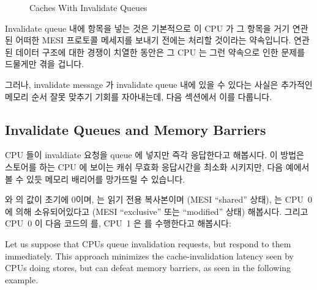 \fi

\begin{figure}[htb]
\centering
{}
\caption{Caches With Invalidate Queues}
\label{fig:app:whymb:Caches With Invalidate Queues}
\end{figure}

Invalidate queue 내에 항목을 넣는 것은 기본적으로 이 CPU 가 그 항목을 거기
연관된 어떠한 MESI 프로토콜 메세지를 보내기 전에는 처리할 것이라는 약속입니다.
연관된 데이터 구조에 대한 경쟁이 치열한 동안은 그 CPU 는 그런 약속으로 인한
문제를 드물게만 겪을 겁니다.

그러나, invalidate message 가 invalidate queue 내에 있을 수 있다는 사실은
추가적인 메모리 순서 잘못 맞추기 기회를 자아내는데, 다음 섹션에서 이를
다룹니다.

\iffalse

Placing an entry into the invalidate queue is essentially a promise
by the CPU to process that entry before transmitting any MESI protocol
messages regarding that cache line.
As long as the corresponding data structures are not highly contended,
the CPU will rarely be inconvenienced by such a promise.

However, the fact that invalidate messages can be buffered in the
invalidate queue provides additional opportunity for memory-misordering,
as discussed in the next section.

\fi

\subsection{Invalidate Queues and Memory Barriers}
\label{sec:app:whymb:Invalidate Queues and Memory Barriers}

CPU 들이 invaldiate 요청을 queue 에 넣지만 즉각 응답한다고 해봅시다.
이 방법은 스토어를 하는 CPU 에 보이는 캐쉬 무효화 응답시간을 최소화 시키지만,
다음 예에서 볼 수 있듯 메모리 배리어를 망가뜨릴 수 있습니다.

 와  의 값이 초기에 0이며,  는 읽기 전용 복사본이며 (MESI
``shared'' 상태),  는 CPU~0 에 의해 소유되어있다고 (MESI ``exclusive''
또는 ``modified'' 상태) 해봅시다.
그리고 CPU~0 이 다음 코드의  를, CPU~1 은  를 수행한다고
해봅시다:

\iffalse

Let us suppose that CPUs queue invalidation requests, but respond to
them immediately.
This approach minimizes the cache-invalidation latency seen by CPUs
doing stores, but can defeat memory barriers, as seen in the following
example.

